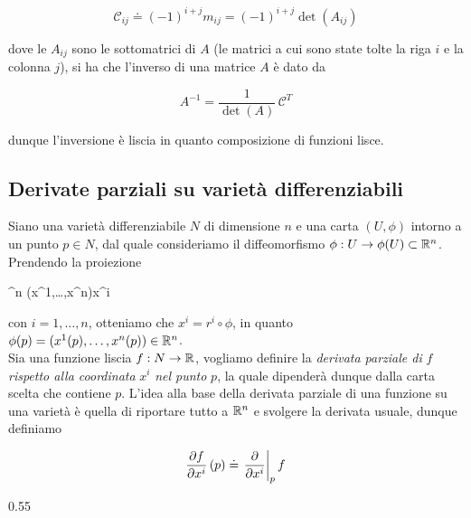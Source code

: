 \begin{equation}
	\mathcal{C}_{ij} \doteq (-1)^{i+j} m_{ij} = (-1)^{i+j} \det(A_{ij})
\end{equation}

dove le $ A_{ij} $ sono le sottomatrici di $ A $ (le matrici a cui sono state tolte la riga $ i $ e la colonna $ j $), si ha che l'inverso di una matrice $ A $ è dato da

\begin{equation}
	A^{-1} = \dfrac{1}{\det(A)} \, \mathcal{C}^{T}
\end{equation}

dunque l'inversione è liscia in quanto composizione di funzioni lisce.

\subsection{Derivate parziali su varietà differenziabili}

Siano una varietà differenziabile $ N $ di dimensione $ n $ e una carta $ (U,\phi) $ intorno a un punto $ p \in N $, dal quale consideriamo il diffeomorfismo $ \phi : U \to \phi(U) \subset \mathbb{R}^{n} $. Prendendo la proiezione

	{\R^{n}}{\R}
	{(x^{1},\dots,x^{n})}{x^{i}}

con $ i=1,\dots,n $, otteniamo che $ x^{i} = r^{i} \circ \phi $, in quanto $ \phi(p) = (x^{1}(p),\dots,x^{n}(p)) \in \mathbb{R}^{n} $.\\
Sia una funzione liscia $ f : N \to \mathbb{R} $, vogliamo definire la \textit{derivata parziale di} $ f $ \textit{rispetto alla coordinata} $ x^{i} $ \textit{nel punto} $ p $, la quale dipenderà dunque dalla carta scelta che contiene $ p $. L'idea alla base della derivata parziale di una funzione su una varietà è quella di riportare tutto a $ \mathbb{R}^{n} $ e svolgere la derivata usuale, dunque definiamo

\begin{equation}
	\pdv{f}{x^{i}} \, (p) \doteq \eval{ \pdv{x^{i}} }_{p} f
\end{equation}

	{0.55}{%
			}

